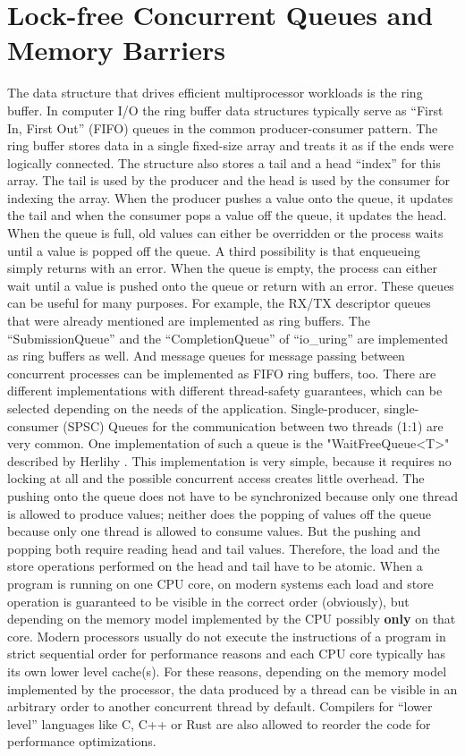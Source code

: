 \section{Lock-free Concurrent Queues and Memory Barriers}
The data structure that drives efficient multiprocessor workloads is the ring buffer. In computer I/O the ring buffer data structures typically serve as “First In, First Out” (FIFO) queues in the common producer-consumer pattern. The ring buffer stores data in a single fixed-size array and treats it as if the ends were logically connected. The structure also stores a tail and a head “index” for this array. The tail is used by the producer and the head is used by the consumer for indexing the array. When the producer pushes a value onto the queue, it updates the tail and when the consumer pops a value off the queue, it updates the head. When the queue is full, old values can either be overridden or the process waits until a value is popped off the queue. A third possibility is that enqueueing simply returns with an error. When the queue is empty, the process can either wait until a value is pushed onto the queue or return with an error. These queues can be useful for many purposes. For example, the RX/TX descriptor queues that were already mentioned are implemented as ring buffers. The “SubmissionQueue” and the “CompletionQueue” of “io\_uring” are implemented as ring buffers as well. And message queues for message passing between concurrent processes can be implemented as FIFO ring buffers, too. \newline
There are different implementations with different thread-safety guarantees, which can be selected depending on the needs of the application. Single-producer, single-consumer (SPSC) Queues for the communication between two threads (1:1) are very common. One implementation of such a queue is the "WaitFreeQueue<T>" described by Herlihy  \cite[45-48]{herlihy:art_of_mp}. This implementation is very simple, because it requires no locking at all and the possible concurrent access creates little overhead. The pushing onto the queue does not have to be synchronized because only one thread is allowed to produce values; neither does the popping of values off the queue because only one thread is allowed to consume values. But the pushing and popping both require reading head and tail values. Therefore, the load and the store operations performed on the head and tail have to be atomic. \newline
When a program is running on one CPU core, on modern systems each load and store operation is guaranteed to be visible in the correct order (obviously), but depending on the memory model implemented by the CPU possibly \textbf{only} on that core. Modern processors usually do not execute the instructions of a program in strict sequential order for performance reasons and each CPU core typically has its own lower level cache(s). For these reasons, depending on the memory model implemented by the processor, the data produced by a thread can be visible in an arbitrary order to another concurrent thread by default. Compilers for “lower level” languages like C, C++ or Rust are also allowed to reorder the code for performance optimizations. \newline
